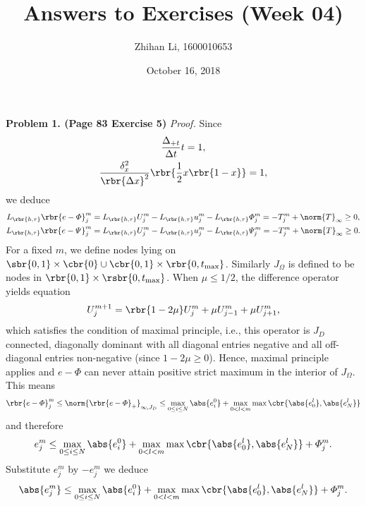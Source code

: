 \documentclass[english, nochinese]{pnote}
\title{Answers to Exercises (Week 04)}
\author{Zhihan Li, 1600010653}
\date{October 16, 2018}
\begin{document}
\maketitle

\textbf{Problem 1. (Page 83 Exercise 5)} \textit{Proof.} Since
\begin{gather}
\frac{\Delta_{ + t }}{ \Delta t } t = 1, \\
\frac{\delta_x^2}{\rbr{ \Delta x }^2} \rbr{ \frac{1}{2} x \rbr{ 1 - x } } = 1,
\end{gather}
we deduce
\begin{gather}
L_{\rbr{ h, \tau }} \rbr{ e - \varPhi }_j^m = L_{\rbr{ h, \tau }} U_j^m - L_{\rbr{ h, \tau }} u_j^m - L_{\rbr{ h, \tau }} \varPhi_j^m = - T_j^m + \norm{T}_{\infty} \ge 0, \\
L_{\rbr{ h, \tau }} \rbr{ e - \varPsi }_j^m = L_{\rbr{ h, \tau }} U_j^m - L_{\rbr{ h, \tau }} u_j^m - L_{\rbr{ h, \tau }} \varPsi_j^m = - T_j^m + \norm{T}_{\infty} \ge 0.
\end{gather}
For a fixed $m$, we define nodes lying on $ \sbr{ 0, 1 } \times \cbr{0} \cup \cbr{ 0, 1 } \times \rbr{ 0, t_{\text{max}} } $. Similarly $J_{\Omega}$ is defined to be nodes in $ \rbr{ 0, 1 } \times \rsbr{ 0, t_{\text{max}} } $. When $ \mu \le 1 / 2 $, the difference operator yields equation
\begin{equation}
U_j^{ m + 1 } = \rbr{ 1 - 2 \mu } U_j^m + \mu U_{ j - 1 }^m + \mu U_{ j + 1 }^m,
\end{equation}
which satisfies the condition of maximal principle, i.e., this operator is $J_D$ connected, diagonally dominant with all diagonal entries negative and all off-diagonal entries non-negative (since $ 1 - 2 \mu \ge 0 $). Hence, maximal principle applies and $ e - \varPhi $ can never attain positive strict maximum in the interior of $J_{\Omega}$. This means
\begin{equation}
\rbr{ e - \varPhi }_j^m \le \norm{\rbr{ e - \varPhi }_+}_{ \infty, J_D } \le \max_{ 0 \le i \le N } \abs{e_i^0} + \max_{ 0 < l < m } \max \cbr{ \abs{e_0^l}, \abs{e_N^l} }
\end{equation}
and therefore
\begin{equation}
e_j^m \le \max_{ 0 \le i \le N } \abs{e_i^0} + \max_{ 0 < l < m } \max \cbr{ \abs{e_0^l}, \abs{e_N^l} } + \varPhi_j^m.
\end{equation}
Substitute $e_j^m$ by $-e_j^m$ we deduce
\begin{equation}
\abs{e_j^m} \le \max_{ 0 \le i \le N } \abs{e_i^0} + \max_{ 0 < l < m } \max \cbr{ \abs{e_0^l}, \abs{e_N^l} } + \varPhi_j^m.
\end{equation}
\end{document}
